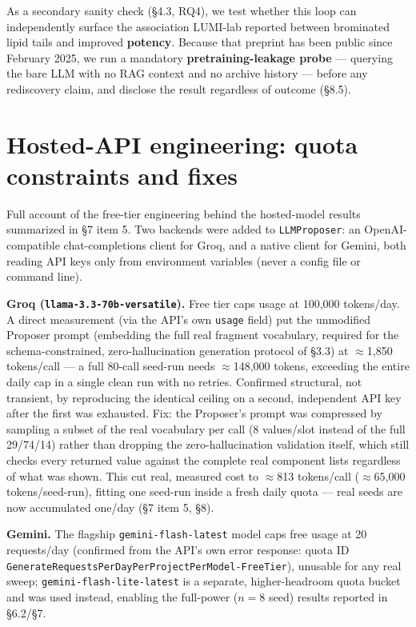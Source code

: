 \documentclass{article}
\begin{document}
As a secondary sanity check (\S4.3, RQ4), we test whether this loop can
independently surface the association LUMI-lab reported between
brominated lipid tails and improved \textbf{potency}. Because that
preprint has been public since February 2025, we run a mandatory
\textbf{pretraining-leakage probe} --- querying the bare LLM with no RAG
context and no archive history --- before any rediscovery claim, and
disclose the result regardless of outcome (\S8.5).

\section{Hosted-API engineering: quota constraints and fixes}

Full account of the free-tier engineering behind the hosted-model results summarized in \S7
item 5. Two backends were added to \texttt{LLMProposer}: an OpenAI-compatible chat-completions
client for Groq, and a native client for Gemini, both reading API keys only from environment
variables (never a config file or command line).

\textbf{Groq (\texttt{llama-3.3-70b-versatile}).} Free tier caps usage at 100,000 tokens/day. A
direct measurement (via the API's own \texttt{usage} field) put the unmodified Proposer prompt
(embedding the full real fragment vocabulary, required for the schema-constrained,
zero-hallucination generation protocol of \S3.3) at $\approx$1,850 tokens/call --- a full 80-call
seed-run needs $\approx$148,000 tokens, exceeding the entire daily cap in a single clean run with
no retries. Confirmed structural, not transient, by reproducing the identical ceiling on a second,
independent API key after the first was exhausted. Fix: the Proposer's prompt was compressed by
sampling a subset of the real vocabulary per call (8 values/slot instead of the full 29/74/14)
rather than dropping the zero-hallucination validation itself, which still checks every returned
value against the complete real component lists regardless of what was shown. This cut real,
measured cost to $\approx$813 tokens/call ($\approx$65,000 tokens/seed-run), fitting one
seed-run inside a fresh daily quota --- real seeds are now accumulated one/day (\S7 item 5, \S8).

\textbf{Gemini.} The flagship \texttt{gemini-flash-latest} model caps free usage at 20
requests/day (confirmed from the API's own error response: quota ID
\texttt{GenerateRequestsPerDayPerProjectPerModel-FreeTier}), unusable for any real sweep;
\texttt{gemini-flash-lite-latest} is a separate, higher-headroom quota bucket and was used
instead, enabling the full-power ($n=8$ seed) results reported in \S6.2/\S7.
\end{document}
